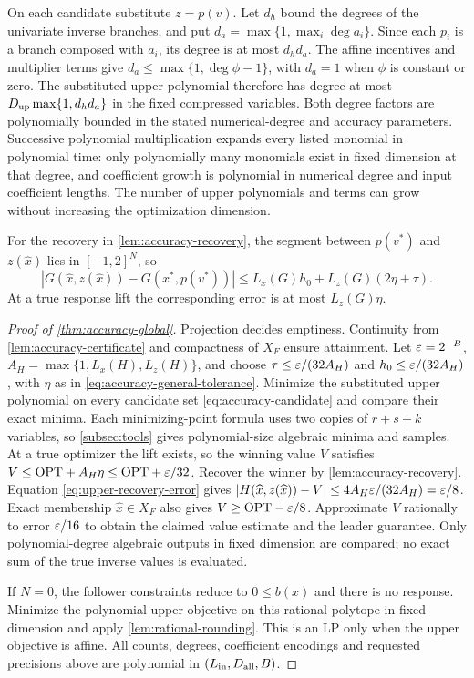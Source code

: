 On each candidate substitute $z=p(v)$. Let $d_h$ bound the degrees
of the univariate inverse branches, and put
$d_a=\max\{1,\max_i\deg a_i\}$. Since each $p_i$ is a branch
composed with $a_i$, its degree is at most $d_h d_a$.
The affine incentives and multiplier terms give
$d_a\le\max\{1,\deg\phi-1\}$, with $d_a=1$ when $\phi$ is
constant or zero. The substituted upper polynomial therefore has degree
at most $D_{\rm up}\max\{1,d_h d_a\}$ in the fixed compressed
variables. Both degree factors are polynomially bounded in the stated
numerical-degree and accuracy parameters.
Successive polynomial multiplication expands every listed monomial in
polynomial time: only polynomially many monomials exist in fixed
dimension at that degree, and coefficient growth is polynomial in
numerical degree and input coefficient lengths. The number of upper
polynomials and terms can grow without increasing the optimization
dimension.

For the recovery in \cref{lem:accuracy-recovery}, the segment between
$p(v^*)$ and $z(\widehat x)$ lies in $[-1,2]^N$, so
\begin{equation}\label{eq:upper-recovery-error}
 |G(\widehat x,z(\widehat x))-G(x^*,p(v^*))|
 \le L_x(G)h_0+L_z(G)(2\eta+\tau).
\end{equation}
At a true response lift the corresponding error is at most $L_z(G)\eta$.

\begin{proof}[Proof of \cref{thm:accuracy-global}]
Projection decides emptiness. Continuity from
\cref{lem:accuracy-certificate} and compactness of $X_F$ ensure
attainment. Let $\varepsilon=2^{-B}$,
$A_H=\max\{1,L_x(H),L_z(H)\}$, and choose
$\tau\le\varepsilon/(32A_H)$ and $h_0\le\varepsilon/(32A_H)$, with
$\eta$ as in \eqref{eq:accuracy-general-tolerance}.
Minimize the substituted upper polynomial on every candidate set
\eqref{eq:accuracy-candidate} and compare their exact minima.
Each minimizing-point formula uses two copies of $r+s+k$ variables,
so \cref{subsec:tools} gives polynomial-size algebraic minima
and samples. At a true optimizer the lift exists, so the winning
value $V$ satisfies $V\le\mathrm{OPT}+A_H\eta\le\mathrm{OPT}+\varepsilon/32$.
Recover the winner by \cref{lem:accuracy-recovery}.
Equation \eqref{eq:upper-recovery-error} gives
$|H(\widehat x,z(\widehat x))-V|\le4A_H\varepsilon/(32A_H)=\varepsilon/8$.
Exact membership $\widehat x\in X_F$ also gives
$V\ge\mathrm{OPT}-\varepsilon/8$. Approximate $V$ rationally to error
$\varepsilon/16$ to obtain the claimed value estimate and the leader guarantee.
Only polynomial-degree algebraic outputs in fixed dimension are compared;
no exact sum of the true inverse values is evaluated.

If $N=0$, the follower constraints reduce to $0\le b(x)$ and there
is no response. Minimize the polynomial upper objective on this rational
polytope in fixed dimension and apply \cref{lem:rational-rounding}.
This is an LP only when the upper objective is affine. All counts,
degrees, coefficient encodings and requested precisions above are
polynomial in $(L_{\rm in},D_{\rm all},B)$.
\end{proof}

